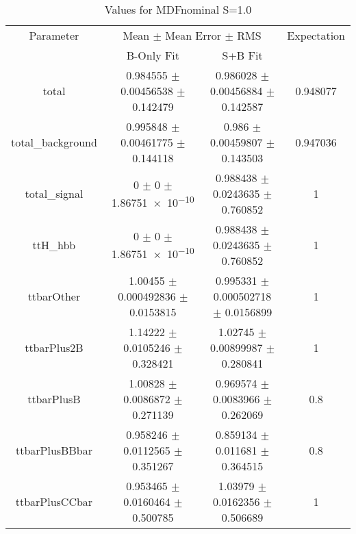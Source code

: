 \begin{table}
\centering
\caption{Values for MDFnominal S=1.0}
\begin{tabular}{cccc}
\toprule
Parameter & \multicolumn{2}{c}{Mean $\pm$ Mean Error $\pm$ RMS} & Expectation\\
 & B-Only Fit & S+B Fit & \\
\midrule
total & \num{0.984555} $\pm$ \num{0.00456538} $\pm$ \num{0.142479} & \num{0.986028} $\pm$ \num{0.00456884} $\pm$ \num{0.142587} & \num{0.948077}\\
total\_background & \num{0.995848} $\pm$ \num{0.00461775} $\pm$ \num{0.144118} & \num{0.986} $\pm$ \num{0.00459807} $\pm$ \num{0.143503} & \num{0.947036}\\
total\_signal & \num{0} $\pm$ \num{0} $\pm$ \num{1.86751e-10} & \num{0.988438} $\pm$ \num{0.0243635} $\pm$ \num{0.760852} & \num{1}\\
ttH\_hbb & \num{0} $\pm$ \num{0} $\pm$ \num{1.86751e-10} & \num{0.988438} $\pm$ \num{0.0243635} $\pm$ \num{0.760852} & \num{1}\\
ttbarOther & \num{1.00455} $\pm$ \num{0.000492836} $\pm$ \num{0.0153815} & \num{0.995331} $\pm$ \num{0.000502718} $\pm$ \num{0.0156899} & \num{1}\\
ttbarPlus2B & \num{1.14222} $\pm$ \num{0.0105246} $\pm$ \num{0.328421} & \num{1.02745} $\pm$ \num{0.00899987} $\pm$ \num{0.280841} & \num{1}\\
ttbarPlusB & \num{1.00828} $\pm$ \num{0.0086872} $\pm$ \num{0.271139} & \num{0.969574} $\pm$ \num{0.0083966} $\pm$ \num{0.262069} & \num{0.8}\\
ttbarPlusBBbar & \num{0.958246} $\pm$ \num{0.0112565} $\pm$ \num{0.351267} & \num{0.859134} $\pm$ \num{0.011681} $\pm$ \num{0.364515} & \num{0.8}\\
ttbarPlusCCbar & \num{0.953465} $\pm$ \num{0.0160464} $\pm$ \num{0.500785} & \num{1.03979} $\pm$ \num{0.0162356} $\pm$ \num{0.506689} & \num{1}\\
\bottomrule
\end{tabular}
\end{table}